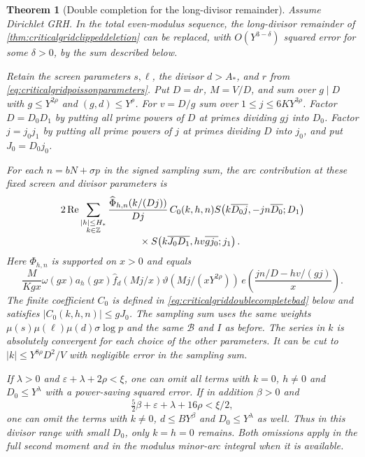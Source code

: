 \documentclass[11pt,a4paper]{article}
\numberwithin{equation}{section}
\newtheorem{theorem}{Theorem}[section]
\begin{document}
\begin{theorem}[Double completion for the long-divisor remainder]
\label{thm:criticalgriddoublecompletion}
Assume Dirichlet GRH. In the total even-modulus sequence,
the long-divisor remainder of
\cref{thm:criticalgridclippeddeletion} can be replaced, with
$O(Y^{3-\delta})$ squared error for some $\delta>0$, by the
sum described below.

Retain the screen parameters $s,\ell$, the divisor $d>A_*$,
and $r$ from \cref{eq:criticalgridpoissonparameters}. Put
$D=dr$, $M=V/D$, and sum over $g\mid D$ with
$g\le Y^{2\rho}$ and $(g,d)\le Y^\rho$. For $v=D/g$
sum over $1\le j\le 6 K Y^{3\rho}$.
Factor $D=D_0D_1$ by putting all prime powers of $D$
at primes dividing $gj$ into $D_0$. Factor $j=j_0j_1$
by putting all prime powers of $j$ at primes dividing
$D$ into $j_0$, and put $J_0=D_0j_0$.

For each $n=bN+\sigma p$ in the signed sampling sum,
the arc contribution at these fixed screen and divisor
parameters is
\begin{align}
 &2\operatorname{Re}\sum_{\substack{|h|\le H_*\\ k\in\mathbb Z}}
       \frac{\widehat\Phi_{h,n}(k/(Dj))}{Dj}\,
       C_0(k,h,n)
       S\!\left(k\overline{D_0j},-j n\overline{D_0};D_1\right)
       \notag\\[-2pt]
 &\hspace{8em}\times
       S\!\left(k\overline{J_0D_1},
                          h v\overline{g j_0};j_1\right).
 \label{eq:criticalgriddoublecomplete}
\end{align}
Here $\Phi_{h,n}$ is supported on $x>0$ and equals
\[
 \frac{M}{K g x}\omega(gx)a_h(gx)\widehat f_d(Mj/x)
   \vartheta(Mj/(xY^{2\rho}))\,
   e\!\left(\frac{j n/D-h v/(g j)}{x}\right).
\]
The finite coefficient $C_0$ is defined in
\cref{eq:criticalgriddoublecompletebad} below and satisfies
$|C_0(k,h,n)|\le gJ_0$. The sampling sum uses the same
weights $\mu(s)\mu(\ell)\mu(d)\sigma\log p$ and the same
$\mathcal B$ and $I$ as before. The series in $k$ is
absolutely convergent for each choice of the other parameters.
It can be cut to $|k|\le Y^{8\rho}D^2/V$ with negligible
error in the sampling sum.

If $\lambda>0$ and $\varepsilon+\lambda+2\rho<\xi$,
one can omit all terms with $k=0$, $h\ne0$ and
$D_0\le Y^\lambda$ with a power-saving squared error.
If in addition $\beta>0$ and
\begin{equation}
 \tfrac52\beta+\varepsilon+\lambda+16\rho<\xi/2 ,
 \label{eq:criticalgriddoubletransitioncondition}
\end{equation}
one can omit the terms with $k\ne0$, $d\le B Y^\beta$
and $D_0\le Y^\lambda$ as well. Thus in this divisor
range with small $D_0$, only $k=h=0$ remains.
Both omissions apply in the full second moment and
in the modulus minor-arc integral when it is available.
\end{theorem}
\end{document}
